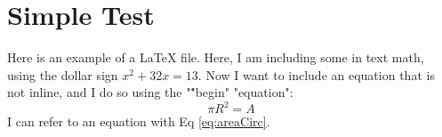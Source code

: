 \documentclass[12pt]{article}
\begin{document}
\maketitle

\section{Simple Test}
Here is an example of a LaTeX file. Here, I am including some in text math, using the dollar sign $x^2+32x=13$. Now I want to include an equation that is not inline, and I do so using the "\" "begin" "{equation}":
\begin{equation}\label{eq:areaCirc}
	\pi R^2 = A
\end{equation}
I can refer to an equation with Eq \eqref{eq:areaCirc}. 

\begin{comment}
I've commented out this section to show you how to add a figure. Delete the lines "begin comment" and "end comment" to include this, but you'll have to have a file called "blank.eps" or change the name of the file to the name of your figure to include in the same folder.
\begin{figure}[h]
	\centering
	\texttt{[image: blank.eps]}
	\caption{Template for a figure, you will need to add the figure.}
	\label{fig:blank}
\end{figure}
I refer to a figure with \ref{fig:blank}.
\end{comment}
\end{document}
